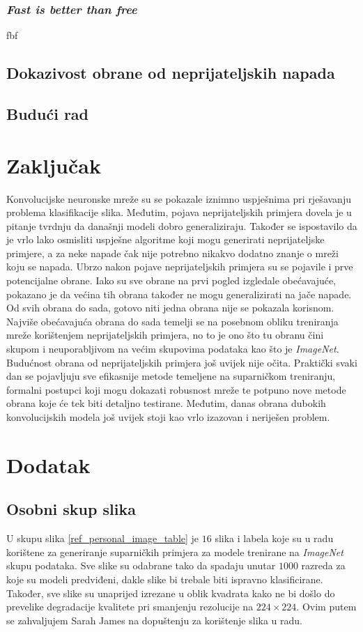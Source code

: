 \documentclass[utf8, diplomski]{fer}
\begin{document}
\subsection{\textit{Fast is better than free}}
fbf\citep{fbf}
\section{Dokazivost obrane od neprijateljskih napada}
\section{Budući rad}

\chapter{Zaključak}
Konvolucijske neuronske mreže su se pokazale iznimno uspješnima pri rješavanju problema klasifikacije slika. Međutim, pojava neprijateljskih primjera dovela je u pitanje tvrdnju da današnji modeli dobro generaliziraju. Također se ispostavilo da je vrlo lako osmisliti uspješne algoritme koji mogu generirati neprijateljske primjere, a za neke napade čak nije potrebno nikakvo dodatno znanje o mreži koju se napada. Ubrzo nakon pojave neprijateljskih primjera su se pojavile i prve potencijalne obrane. Iako su sve obrane na prvi pogled izgledale obećavajuće, pokazano je da većina tih obrana također ne mogu generalizirati na jače napade. Od svih obrana do sada, gotovo niti jedna obrana nije se pokazala korisnom. Najviše obećavajuća obrana do sada temelji se na posebnom obliku treniranja mreže korištenjem neprijateljskih primjera, no to je ono što tu obranu čini skupom i neuporabljivom na većim skupovima podataka kao što je \textit{ImageNet}. Budućnost obrana od neprijateljskih primjera još uvijek nije očita. Praktički svaki dan se pojavljuju sve efikasnije metode temeljene na suparničkom treniranju, formalni postupci koji mogu dokazati robusnost mreže te potpuno nove metode obrana koje će tek biti detaljno testirane. Međutim, danas obrana dubokih konvolucijskih modela još uvijek stoji kao vrlo izazovan i neriješen problem.





\chapter{Dodatak}\label{dodatak}
\section{Osobni skup slika}\label{osobni_skup}
U skupu slika \ref{ref_personal_image_table} je $16$ slika i labela koje su u radu korištene za generiranje suparničkih primjera za modele trenirane na \textit{ImageNet} skupu podataka. Sve slike su odabrane tako da spadaju unutar $1000$ razreda za koje su modeli predviđeni, dakle slike bi trebale biti ispravno klasificirane. Također, sve slike su unaprijed izrezane u oblik kvadrata kako ne bi došlo do prevelike degradacije kvalitete pri smanjenju rezolucije na $224\times224$. Ovim putem se zahvaljujem Sarah James na dopuštenju za korištenje slika u radu.
\end{document}
